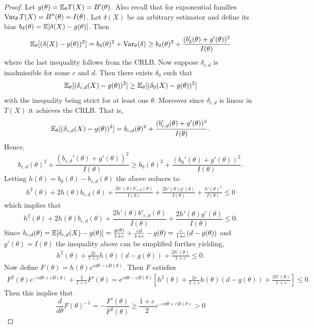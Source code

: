 \begin{proof}
	Let $g(\theta) = \mathbb{E}_\theta T(X) = B'(\theta)$. Also recall that for exponential families $\operatorname{Var}_\theta T(X) = B''(\theta) = I(\theta)$. Let $\delta(X)$ be an arbitrary estimator and define its bias $b_\delta(\theta) = \mathbb{E}[\delta(X) - g(\theta)]$. Then  \[
		\mathbb{E}_\theta[(\delta(X) - g(\theta))^2] = b_\delta(\theta)^2 + \operatorname{Var}_\theta(\delta) \geq b_\delta(\theta)^2  + \frac{(b_\delta'(\theta) + g'(\theta))^2}{I(\theta)}
	\] where the last inequality follows from the CRLB. Now suppose $\delta_{c,d}$ is inadmissible for some $c$ and $d$. Then there exists $\delta_0$ such that \[
		\mathbb{E}_\theta[(\delta_{c,d}(X) - g(\theta))^2] \geq \mathbb{E}_\theta[(\delta_0(X) - g(\theta))^2] 
	\] with the inequality being strict for at least one $\theta$. Moreover since $\delta_{c,d}$ is linear in $T(X)$ it achieves the CRLB. That is, \[
			\mathbb{E}_\theta[(\delta_{c,d}(X) - g(\theta))^2] = b_{c,d}(\theta)^2  + \frac{(b_{c,d}'(\theta) + g'(\theta))^2}{I(\theta)}. 
	\] Hence, \[
		b_{c,d}(\theta)^2  + \frac{(b_{c,d}'(\theta) + g'(\theta))^2}{I(\theta)} \geq b_{0}(\theta)^2  + \frac{(b_{0}'(\theta) + g'(\theta))^2}{I(\theta)}.
	\] Letting $h(\theta) = b_0(\theta) - b_{c,d}(\theta)$ the above reduces to 
	\begin{align*}
		h^2(\theta) + 2h(\theta)b_{c,d}(\theta) +  \frac{2h'(\theta)b'_{c,d}(\theta)}{I(\theta)} + \frac{2h'(\theta)g'(\theta)}{I(\theta)} + \frac{h'(\theta)^2}{I(\theta)} \leq 0
	\end{align*} 
	which implies that \[
		h^2(\theta) + 2h(\theta)b_{c,d}(\theta) +  \frac{2h'(\theta)b'_{c,d}(\theta)}{I(\theta)} + \frac{2h'(\theta)g'(\theta)}{I(\theta)} \leq 0.
	\]
	Since $b_{c,d}(\theta) = \mathbb{E}[\delta_{c, d}(X) - g(\theta)] = \frac{g(\theta)}{1+c} + \frac{cd}{1+c} - g(\theta) = \frac{c}{1+c} (d - g(\theta))$ and $g'(\theta) = I(\theta)$ the  inequality above can be simplified further yielding, \begin{align*}
		h^2(\theta) + \frac{2c}{1+c} h(\theta) (d - g(\theta)) + \frac{2h'(\theta)}{1+c} \leq 0.
	\end{align*}
	Now define $F(\theta) = h(\theta) e^{cd\theta - cB(\theta)}$. Then $F$ satisfies \begin{align*}
		F^2(\theta) e^{-cd\theta + cB(\theta)} + \frac{2}{1+c} F'(\theta) = e^{cd\theta - cB(\theta)} \left[h^2(\theta) + \frac{2c}{1+c} h(\theta) (d - g(\theta)) + \frac{2h'(\theta)}{1+c} \right] \leq 0.
	\end{align*} Then this implies that \[
		\frac{d}{d\theta} F(\theta)^{-1} = -\frac{F'(\theta)}{F^2(\theta)} \geq \frac{1+c}{2}  e^{-cd\theta + cB(\theta)} > 0
\]
\end{proof}
